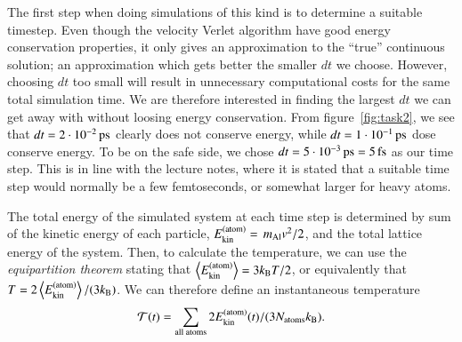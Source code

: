 The first step when doing simulations of this kind is to determine a suitable timestep. Even though the velocity Verlet algorithm have good energy conservation properties, it only gives an approximation to the ``true'' continuous solution; an approximation which gets better the smaller $dt$ we choose. However, choosing $dt$ too small will result in unnecessary computational costs for the same total simulation time. We are therefore interested in finding the largest $dt$ we can get away with without loosing energy conservation. From figure~\ref{fig:task2}, we see that $dt = \unit[2 \cdot 10^{-2}]{ps}$ clearly does not conserve energy, while $dt = \unit[1 \cdot 10^{-1}]{ps}$ dose conserve energy. To be on the safe side, we chose $dt = \unit[5 \cdot 10^{-3}]{ps} = \unit[5]{fs}$ as our time step. This is in line with the lecture notes, where it is stated that a suitable time step would normally be a few femtoseconds, or somewhat larger for heavy atoms.

The total energy of the simulated system at each time step is determined by sum of the kinetic energy of each particle, $E_{\rm kin}^{\rm(atom)}=\,m_{\rm Al}v^2/2$, and the total lattice energy of the system. Then, to calculate the temperature, we can use the \emph{equipartition theorem} stating that $\ev{E_{\rm kin}^{\rm(atom)}}=3k_{\rm B}T/2$, or equivalently that $T=2\ev{E_{\rm kin}^{\rm(atom)}}/(3k_{\rm B})$. We can therefore define an instantaneous temperature
\begin{equation}
\label{eq:T_instantaneous}
\mathcal{T}(t)=\sum_{\text{all atoms}}2E_{\rm kin}^{\rm(atom)}(t)/(3N_{\rm atoms}k_{\rm B}).
\end{equation}


